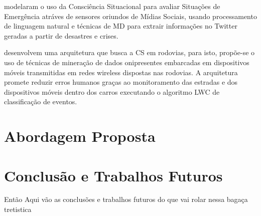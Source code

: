 \documentclass[12pt]{article}
\begin{document}
\cite{Yin_et_al_2012} modelaram o uso da Consciência Situacional para avaliar Situações de Emergência atráves de sensores oriundos de Mídias Sociais, usando processamento de linguagem natural e técnicas de MD para extrair informações no Twitter geradas a partir de desastres e crises.

\cite{Krishnaswamy_et_al_2005} desenvolvem uma arquitetura que busca a CS em rodovias, para isto, propõe-se o uso de técnicas de mineração de dados onipresentes embarcadas em dispositivos móveis transmitidas em redes wireless dispostas nas rodovias. A arquitetura promete reduzir erros humanos graças ao monitoramento das estradas e dos dispositivos móveis dentro dos carros executando o algoritmo LWC de classificação de eventos.

\section{Abordagem Proposta}


\section{Conclusão e Trabalhos Futuros}
Então Aqui vão as conclusões e trabalhos futuros do que vai rolar nessa bagaça tretistica



\end{document}
